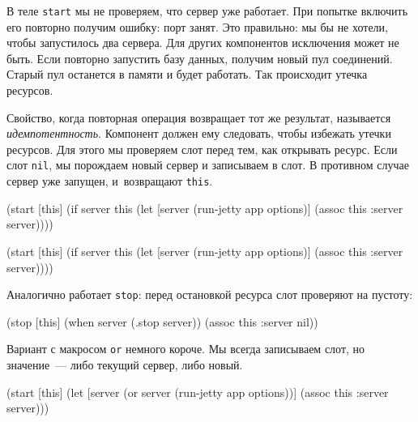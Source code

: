 \fi

В теле \verb|start| мы не проверяем, что сервер уже работает. При попытке
включить его повторно получим ошибку: порт занят. Это правильно: мы бы не
хотели, чтобы запустилось два сервера. Для других компонентов исключения может
не быть. Если повторно запустить базу данных, получим новый пул
соединений. Старый пул останется в памяти и будет работать. Так происходит
утечка ресурсов.


Свойство, когда повторная операция возвращает тот же результат, называется
\emph{идемпотентность}. Компонент должен ему следовать, чтобы избежать утечки
ресурсов. Для этого мы проверяем слот перед тем, как открывать ресурс. Если слот
\verb|nil|, мы порождаем новый сервер и записываем в слот. В противном случае
сервер уже запущен, и~возвращают \verb|this|.

\ifx\DEVICETYPE\MOBILE

\begin{english}
  \begin{clojure}
(start [this]
  (if server
    this
    (let [server (run-jetty
                   app options)]
      (assoc this :server server))))
  \end{clojure}
\end{english}

\else

\begin{english}
  \begin{clojure}
(start [this]
  (if server
    this
    (let [server (run-jetty app options)]
      (assoc this :server server))))
  \end{clojure}
\end{english}

\fi

\noindent
Аналогично работает \verb|stop|: перед остановкой ресурса слот проверяют на
пустоту:

\begin{english}
  \begin{clojure}
(stop [this]
  (when server
    (.stop server))
  (assoc this :server nil))
  \end{clojure}
\end{english}

Вариант с макросом \verb|or| немного короче. Мы всегда записываем слот, но
значение~--- либо текущий сервер, либо новый.

\ifx\DEVICETYPE\MOBILE

\begin{english}
  \begin{clojure}
(start [this]
  (let [server (or server
                   (run-jetty
                     app options))]
    (assoc this :server server)))
  \end{clojure}
\end{english}

